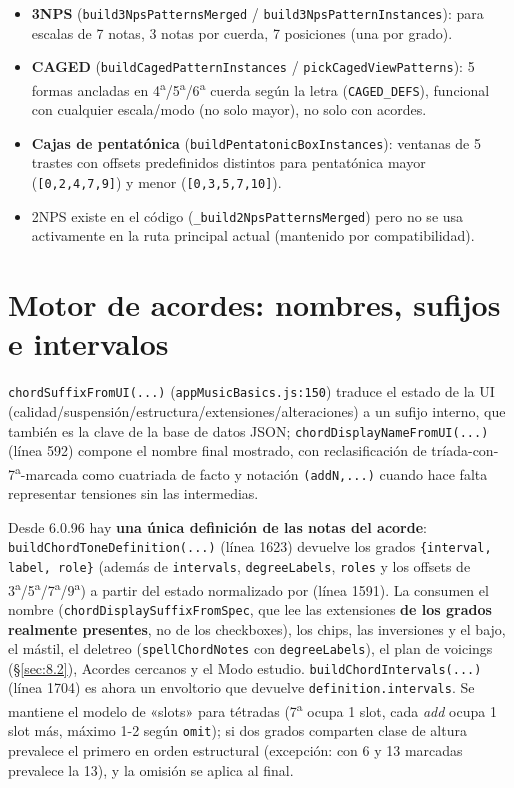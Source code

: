\documentclass[a4paper,11pt,oneside]{report}
\newcommand{\Sref}[1]{\S\ref{#1}}
\begin{document}
\begin{itemize}
\item \textbf{3NPS} (\lstinline!build3NpsPatternsMerged! / \lstinline!build3NpsPatternInstances!): para escalas de 7 notas, 3 notas por cuerda, 7 posiciones (una por grado).
\item \textbf{CAGED} (\lstinline!buildCagedPatternInstances! / \lstinline!pickCagedViewPatterns!): 5 formas ancladas en 4\textsuperscript{a}/5\textsuperscript{a}/6\textsuperscript{a} cuerda según la letra (\lstinline!CAGED_DEFS!), funcional con cualquier escala/modo (no solo mayor), no solo con acordes.
\item \textbf{Cajas de pentatónica} (\lstinline!buildPentatonicBoxInstances!): ventanas de 5 trastes con offsets predefinidos distintos para pentatónica mayor (\lstinline![0,2,4,7,9]!) y menor (\lstinline![0,3,5,7,10]!).
\item 2NPS existe en el código (\lstinline!_build2NpsPatternsMerged!) pero no se usa activamente en la ruta principal actual (mantenido por compatibilidad).
\end{itemize}

\section{Motor de acordes: nombres, sufijos e intervalos}
\label{sec:7.4}

\lstinline!chordSuffixFromUI(...)! (\lstinline!appMusicBasics.js:150!) traduce el estado de la UI (calidad/suspensión/estructura/extensiones/alteraciones) a un sufijo interno, que también es la clave de la base de datos JSON; \lstinline!chordDisplayNameFromUI(...)! (línea 592) compone el nombre final mostrado, con reclasificación de tríada-con-7\textsuperscript{a}-marcada como cuatriada de facto y notación \lstinline!(addN,...)! cuando hace falta representar tensiones sin las intermedias.

Desde 6.0.96 hay \textbf{una única definición de las notas del acorde}: \lstinline!buildChordToneDefinition(...)! (línea 1623) devuelve los grados \lstinline!{interval, label, role}! (además de \lstinline!intervals!, \lstinline!degreeLabels!, \lstinline!roles! y los offsets de 3\textsuperscript{a}/5\textsuperscript{a}/7\textsuperscript{a}/9\textsuperscript{a}) a partir del estado normalizado por \texttt{} (línea 1591). La consumen el nombre (\lstinline!chordDisplaySuffixFromSpec!, que lee las extensiones \textbf{de los grados realmente presentes}, no de los checkboxes), los chips, las inversiones y el bajo, el mástil, el deletreo (\lstinline!spellChordNotes! con \lstinline!degreeLabels!), el plan de voicings (\Sref{sec:8.2}), Acordes cercanos y el Modo estudio. \lstinline!buildChordIntervals(...)! (línea 1704) es ahora un envoltorio que devuelve \lstinline!definition.intervals!. Se mantiene el modelo de «slots» para tétradas (7\textsuperscript{a} ocupa 1 slot, cada \textit{add} ocupa 1 slot más, máximo 1-2 según \lstinline!omit!); si dos grados comparten clase de altura prevalece el primero en orden estructural (excepción: con 6 y 13 marcadas prevalece la 13), y la omisión se aplica al final.
\end{document}
